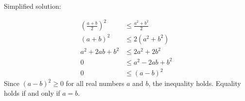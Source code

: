 \documentclass{article}
\begin{document}
Simplified solution:
\begin{tcolorbox}[colback=blue!10, width=\linewidth]
\[
\begin{aligned}
\left(\frac{a+b}{2}\right)^2 &\leq \frac{a^2+b^2}{2} \\
(a+b)^2 &\leq 2(a^2+b^2) \\
a^2 + 2ab + b^2 &\leq 2a^2 + 2b^2 \\
0 &\leq a^2 - 2ab + b^2 \\
0 &\leq (a-b)^2
\end{aligned}
\]
Since $(a-b)^2 \ge 0$ for all real numbers $a$ and $b$, the inequality holds. Equality holds if and only if $a=b$.

\end{tcolorbox}
\end{document}
